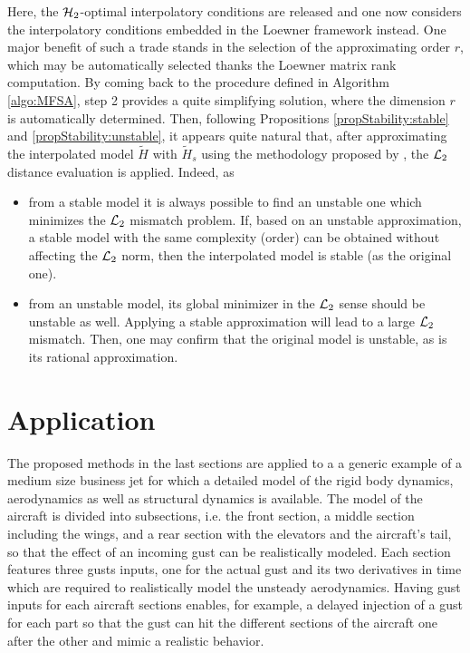 \documentclass[graybox]{svmult}
\begin{document}
Here, the ${\mathcal{H}_{2}}$-optimal interpolatory conditions are released and one now considers the interpolatory conditions embedded in the Loewner framework instead. One major benefit of such a trade stands in the selection of the approximating order $r$, which may be automatically selected thanks the Loewner matrix rank computation. By coming back to the \mfsa procedure defined in Algorithm \ref{algo:MFSA}, step 2 provides a quite simplifying solution, where the dimension $r$ is automatically determined. Then, following Propositions \ref{propStability:stable} and \ref{propStability:unstable}, it appears quite natural that, after approximating the interpolated model $\tilde H$ with $\tilde H_s$ using the methodology proposed by \cite{Kohler:2014}, the ${\mathcal{L}_{2}}$ distance evaluation is applied. Indeed, as 
\begin{itemize}
	\item from a stable model it is always possible to find an unstable one which minimizes the ${\mathcal{L}_{2}}$ mismatch problem. If, based on an unstable approximation, a stable model with the same complexity (order) can be obtained without affecting the ${\mathcal{L}_{2}}$ norm, then the interpolated model is stable (as the original one).
	\item from an unstable model, its global minimizer in the ${\mathcal{L}_{2}}$ sense should be unstable as well. Applying a stable approximation will lead to a large ${\mathcal{L}_{2}}$ mismatch. Then, one may confirm that the original model is unstable, as is its rational approximation.
\end{itemize}


\section{Application}\label{sec:app}
The proposed methods in the last sections are applied to a a generic example of a medium size business jet 
for which a detailed model of the rigid body dynamics, aerodynamics as well as structural dynamics is available.
The model of the aircraft is divided into subsections, i.e. the front section, a middle section including the wings, and a rear section with the elevators and the aircraft's tail, so that the effect of an incoming gust can be realistically modeled. Each section features three gusts inputs, one for the actual gust and its two derivatives in time which are required to realistically model the unsteady aerodynamics. Having  gust inputs for each aircraft sections enables, for example, a delayed injection of a gust for each part  so that the gust can hit the different sections of the aircraft one after the other and mimic a realistic behavior.
\end{document}

